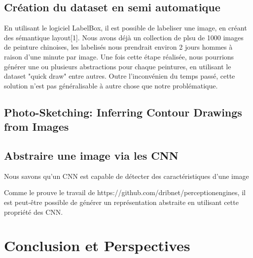 \documentclass[a4paper, 12pt]{book}
\begin{document}
\section{Création du dataset en semi automatique}

En utilisant le logiciel LabelBox, il est possible de labeliser une image, en créant des sémantique layout[1]. Nous avons déjà un collection de plsu de 1000 images de peinture chinoises, les labelisés nous prendrait environ 2 jours hommes à raison d'une minute par image. Une fois cette étape réalisée, nous pourrions générer une ou plusieurs abstractions pour chaque peintures, en utilisant le dataset "quick draw" entre autres. Outre l'inconvénien du temps passé, cette solution n'est pas généralisable à autre chose que notre problématique.

\section{Photo-Sketching: Inferring Contour Drawings from Images}


\section{Abstraire une image via les CNN}
Nous savons qu'un CNN est capable de détecter des caractéristiques d'une image


Comme le prouve le travail de https://github.com/dribnet/perceptionengines, il est peut-être possible de générer un représentation abstraite en utilisant cette propriété des CNN.


\chapter{Conclusion et Perspectives\label{chap-conclusion}}



\end{document}
